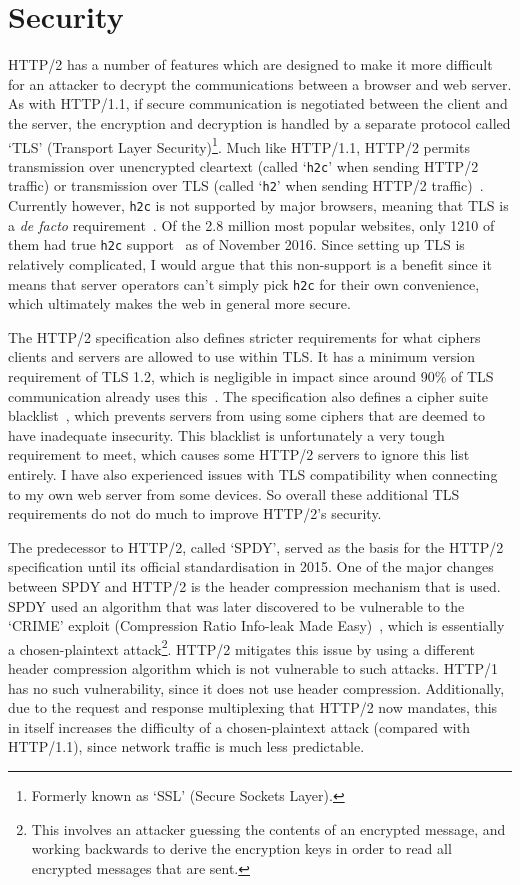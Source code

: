 \section{Security}

HTTP/2 has a number of features which are designed to make it more difficult for an attacker to decrypt the communications between a browser and web server. As with HTTP/1.1, if secure communication is negotiated between the client and the server, the encryption and decryption is handled by a separate protocol called `TLS' (Transport Layer Security)\footnote{Formerly known as `SSL' (Secure Sockets Layer).}. Much like HTTP/1.1, HTTP/2 permits transmission over unencrypted cleartext (called `\texttt{h2c}' when sending HTTP/2 traffic) or transmission over TLS (called `\texttt{h2}' when sending HTTP/2 traffic)~\cite[\S~3.1]{h2}. Currently however, \texttt{h2c} is not supported by major browsers, meaning that TLS is a \textit{de facto} requirement~\cite{tlsh2support}. Of the 2.8 million most popular websites, only 1210 of them had true \texttt{h2c} support~\cite{isthewebhttp2yet} as of November 2016. Since setting up TLS is relatively complicated, I would argue that this non-support is a benefit since it means that server operators can't simply pick \texttt{h2c} for their own convenience, which ultimately makes the web in general more secure.

The HTTP/2 specification also defines stricter requirements for what ciphers clients and servers are allowed to use within TLS\@. It has a minimum version requirement of TLS 1.2, which is negligible in impact since around 90\% of TLS communication already uses this~\cite{sslpulse}. The specification also defines a cipher suite blacklist~\cite[\S 9.2.2]{h2}, which prevents servers from using some ciphers that are deemed to have inadequate insecurity. This blacklist is unfortunately a very tough requirement to meet, which causes some HTTP/2 servers to ignore this list entirely. I have also experienced issues with TLS compatibility when connecting to my own web server from some devices. So overall these additional TLS requirements do not do much to improve HTTP/2's security.

The predecessor to HTTP/2, called `SPDY', served as the basis for the HTTP/2 specification until its official standardisation in 2015. One of the major changes between SPDY and HTTP/2 is the header compression mechanism that is used. SPDY used an algorithm that was later discovered to be vulnerable to the `CRIME' exploit (Compression Ratio Info\hyp{}leak Made Easy)~\cite{crime}, which is essentially a chosen\hyp{}plaintext attack\footnote{This involves an attacker guessing the contents of an encrypted message, and working backwards to derive the encryption keys in order to read all encrypted messages that are sent.}. HTTP/2 mitigates this issue by using a different header compression algorithm which is not vulnerable to such attacks. HTTP/1 has no such vulnerability, since it does not use header compression. Additionally, due to the request and response multiplexing that HTTP/2 now mandates, this in itself increases the difficulty of a chosen\hyp{}plaintext attack (compared with HTTP/1.1), since network traffic is much less predictable. 

